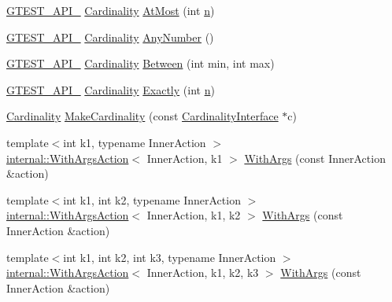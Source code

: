 \begin{DoxyCompactItemize}
\hyperlink{gtest-port_8h_aa73be6f0ba4a7456180a94904ce17790}{G\+T\+E\+S\+T\+\_\+\+A\+P\+I\+\_\+} \hyperlink{classtesting_1_1Cardinality}{Cardinality} \hyperlink{namespacetesting_a5487cd1068c78821ced96fbf542a91bb}{At\+Most} (int \hyperlink{app_2main_8cpp_acfc02ec89670db29251fda6a66602ce2}{n})
\item 
\hyperlink{gtest-port_8h_aa73be6f0ba4a7456180a94904ce17790}{G\+T\+E\+S\+T\+\_\+\+A\+P\+I\+\_\+} \hyperlink{classtesting_1_1Cardinality}{Cardinality} \hyperlink{namespacetesting_aa1f8a6371097e1e9b8d6866020f35252}{Any\+Number} ()
\item 
\hyperlink{gtest-port_8h_aa73be6f0ba4a7456180a94904ce17790}{G\+T\+E\+S\+T\+\_\+\+A\+P\+I\+\_\+} \hyperlink{classtesting_1_1Cardinality}{Cardinality} \hyperlink{namespacetesting_a3bb2d3cdd3fdf5b4be1480fce549918e}{Between} (int min, int max)
\item 
\hyperlink{gtest-port_8h_aa73be6f0ba4a7456180a94904ce17790}{G\+T\+E\+S\+T\+\_\+\+A\+P\+I\+\_\+} \hyperlink{classtesting_1_1Cardinality}{Cardinality} \hyperlink{namespacetesting_aa9b1b32ba9e8d3db8ac0af0fc8785c8d}{Exactly} (int \hyperlink{app_2main_8cpp_acfc02ec89670db29251fda6a66602ce2}{n})
\item 
\hyperlink{classtesting_1_1Cardinality}{Cardinality} \hyperlink{namespacetesting_af567006969875ab70fc6aa3029576774}{Make\+Cardinality} (const \hyperlink{classtesting_1_1CardinalityInterface}{Cardinality\+Interface} $\ast$c)
\item 
{\footnotesize template$<$int k1, typename Inner\+Action $>$ }\\\hyperlink{classtesting_1_1internal_1_1WithArgsAction}{internal\+::\+With\+Args\+Action}$<$ Inner\+Action, k1 $>$ \hyperlink{namespacetesting_a3bd9eef13bee9065b19d3cd571829c7c}{With\+Args} (const Inner\+Action \&action)
\item 
{\footnotesize template$<$int k1, int k2, typename Inner\+Action $>$ }\\\hyperlink{classtesting_1_1internal_1_1WithArgsAction}{internal\+::\+With\+Args\+Action}$<$ Inner\+Action, k1, k2 $>$ \hyperlink{namespacetesting_aa82fc09250ba172220e6fb7e77249e74}{With\+Args} (const Inner\+Action \&action)
\item 
{\footnotesize template$<$int k1, int k2, int k3, typename Inner\+Action $>$ }\\\hyperlink{classtesting_1_1internal_1_1WithArgsAction}{internal\+::\+With\+Args\+Action}$<$ Inner\+Action, k1, k2, k3 $>$ \hyperlink{namespacetesting_a999614cb785165b9a44a9a95a3753407}{With\+Args} (const Inner\+Action \&action)

\end{DoxyCompactItemize}
